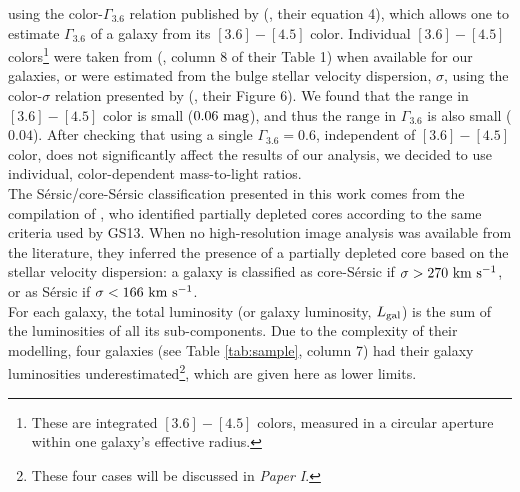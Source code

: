 \documentclass[preprint2]{emulateapj}
\begin{document}
using the color-$\Gamma_{3.6}$ relation published by 
\citeauthor{meidt2014} (\citeyear{meidt2014}, their equation 4), 
which allows one to estimate $\Gamma_{3.6}$ of a galaxy from its $[3.6] - [4.5]$ color. 
Individual $[3.6] - [4.5]$ colors\footnote{These are integrated $[3.6] - [4.5]$ colors, measured in a circular aperture 
within one galaxy's effective radius.} were taken from 
\citeauthor{peletier2012} (\citeyear{peletier2012}, column 8 of their Table 1) 
when available for our galaxies, 
or were estimated from the bulge stellar velocity dispersion, $\sigma$, 
using the color-$\sigma$ relation presented by \citeauthor{peletier2012} (\citeyear{peletier2012}, their Figure 6).
We found that the range in $[3.6] - [4.5]$ color is small ($0.06\rm~mag$), 
and thus the range in $\Gamma_{3.6}$ is also small ($0.04$).
After checking that using a single $\Gamma_{3.6} = 0.6$, independent of $[3.6] - [4.5]$ color, 
does not significantly affect the results of our analysis, 
we decided to use individual, color-dependent mass-to-light ratios. \\
The S\'ersic/core-S\'ersic classification presented in this work 
comes from the compilation of \citet{savorgnangraham2014},
who identified partially depleted cores according to the same criteria used by GS13.
When no high-resolution image analysis was available from the literature, 
they inferred the presence of a partially depleted core based on the stellar velocity dispersion:
a galaxy is classified as core-S\'ersic if $\sigma > 270\rm~km~s^{-1}$,
or as S\'ersic if $\sigma < 166\rm~km~s^{-1}$. \\
For each galaxy, the total luminosity (or galaxy luminosity, $L_{\rm gal}$) is the sum of the luminosities of all its sub-components. 
Due to the complexity of their modelling, 
four galaxies (see Table \ref{tab:sample}, column 7) had their galaxy luminosities 
underestimated\footnote{These four cases will be discussed in \emph{Paper I}.}, 
which are given here as lower limits. 


\end{document}
